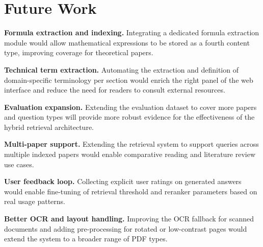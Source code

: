 \documentclass[12pt,a4paper]{report}
\begin{document}
\section{Future Work}

\textbf{Formula extraction and indexing.} Integrating a dedicated formula
extraction module would allow mathematical expressions to be stored as a fourth
content type, improving coverage for theoretical papers.

\textbf{Technical term extraction.} Automating the extraction and definition of
domain-specific terminology per section would enrich the right panel of the web
interface and reduce the need for readers to consult external resources.

\textbf{Evaluation expansion.} Extending the evaluation dataset to cover more
papers and question types will provide more robust evidence for the effectiveness
of the hybrid retrieval architecture.

\textbf{Multi-paper support.} Extending the retrieval system to support queries
across multiple indexed papers would enable comparative reading and literature
review use cases.

\textbf{User feedback loop.} Collecting explicit user ratings on generated
answers would enable fine-tuning of retrieval threshold and reranker parameters
based on real usage patterns.

\textbf{Better OCR and layout handling.} Improving the OCR fallback for scanned
documents and adding pre-processing for rotated or low-contrast pages would
extend the system to a broader range of PDF types.
\end{document}
